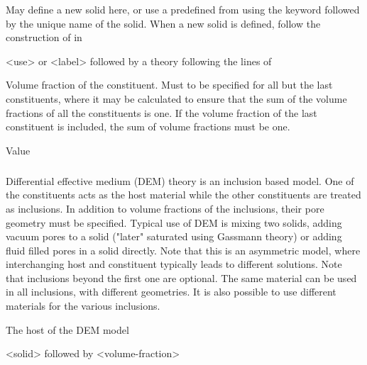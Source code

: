 {
 \slist
   \item \Description May define a new solid here, or use a predefined  from  using the keyword  followed by the unique name of the solid. When a new solid is defined, follow the construction of  in 
   \item \Argument <use> or <label> followed by a theory following the lines of 
   \item \Default
 \elist

 \slist
   \item \Description Volume fraction of the constituent. Must to be specified for all but the last constituents, where it may be calculated to ensure that the sum of the volume fractions of all the constituents is one. If the volume fraction of the last constituent is included, the sum of volume fractions must be one.
   \item \Argument Value
   \item \Default
 \elist

\subparagraph{}
 \slist
   \item \Description Differential effective medium (DEM) theory is an inclusion based model. One of the constituents acts as the host material while the other constituents are treated as inclusions. In addition to volume fractions of the inclusions, their pore geometry must be specified. Typical use of DEM is mixing two solids, adding vacuum pores to a solid ("later" saturated using Gassmann theory) or adding fluid filled pores in a solid directly. Note that this is an asymmetric model, where interchanging host and constituent typically leads to different solutions. Note that inclusions beyond the first one are optional. The same material can be used in all inclusions, with different geometries. It is also possible to use different materials for the various inclusions.
   \item \Argument
   \item \Default
 \elist

 \slist
   \item \Description The host of the DEM model
   \item \Argument <solid> followed by <volume-fraction>
   \item \Default
 \elist

}
